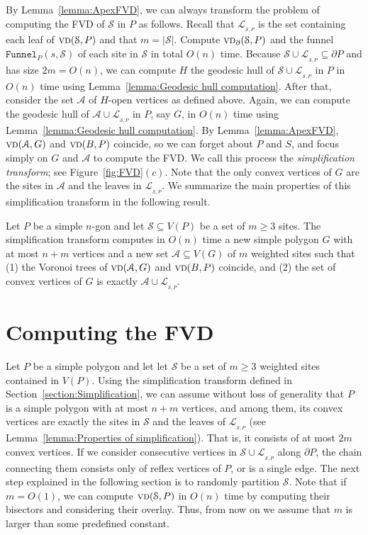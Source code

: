 \documentclass[a4paper,UKenglish]{socg-lipics-v2018}
\newcommand{\s}{\mathcal S}
\newcommand{\funnel}[2][P]{\ensuremath{\mathtt{Funnel}_{\scriptscriptstyle #1}(#2)}}
\newcommand{\vd}[2][P]{\textsc{vd}(#2, #1)}
\newcommand{\bvd}[2][P]{\textsc{vd}_{\partial}(#2, #1)}
\newcommand{\LL}[1][\s, P]{\ensuremath{\mathcal L_{_{#1}}}}
\newcommand{\A}{\ensuremath{\mathcal A}}
\begin{document}
By Lemma~\ref{lemma:ApexFVD}, we can always transform the problem of computing the FVD of $\s$ in $P$ as follows. 
Recall that $\LL$ is the set containing each leaf of $\vd{\s}$ and that $m= |\s|$.
Compute $\bvd{\s}$ and the funnel $\funnel{s, \s}$ of each site in $\s$ in total $O(n)$ time. 
Because $\s\cup \LL\subseteq \partial P$ and has size $2 m = O(n)$, we can compute $H$ the geodesic hull of $\s\cup \LL$ in $P$ in $O(n)$ time using Lemma~\ref{lemma:Geodesic hull computation}. 
After that, consider the set $\A$ of $H$-open vertices as defined above.
Again, we can compute the geodesic hull of $\A\cup \LL$ in $P$, say $G$, in $O(n)$ time using Lemma~\ref{lemma:Geodesic hull computation}. 
By Lemma~\ref{lemma:ApexFVD}, $\vd[G]{\A}$ and $\vd[P]{B}$ coincide, so we can forget about $P$ and $S$, and focus simply on $G$ and $\A$ to compute the FVD.
We call this process the \emph{simplification transform}; see Figure~\ref{fig:FVD}$(c)$. 
Note that the only convex vertices of $G$ are the sites in $\A$ and the leaves in $\LL$. 
We summarize the main properties of this simplification transform in the following result.

\begin{lemma}\label{lemma:Properties of simplification}
Let  $P$ be a simple $n$-gon and let $\s\subseteq V(P)$ be a set of $m\geq 3$ sites.
The simplification transform computes in $O(n)$ time a new simple polygon $G$ with at most $n+m$ vertices and a new set $\A\subseteq V(G)$ of $m$ weighted sites such that (1) the Voronoi trees of $\vd[G]{\A}$ and $\vd[P]{B}$ coincide, and (2) the set of convex vertices of $G$ is exactly $\A\cup \LL$.
\end{lemma}



\section{Computing the FVD}
Let  $P$ be a simple polygon and let let $\s$ be a set of $m\geq 3$ weighted sites contained in $V(P)$.
Using the simplification transform defined in Section~\ref{section:Simplification}, we can assume without loss of generality that $P$ is a simple polygon with at most $n+m$ vertices, and among them, its convex vertices are exactly the sites in $\s$ and the leaves of $\LL$ (see Lemma~\ref{lemma:Properties of simplification}). 
That is, it consists of at most $2m$ convex vertices.
If we consider consecutive vertices in $\s\cup \LL$ along $\partial P$, the chain connecting them consists only of reflex vertices of $P$, or is a single edge. 
The next step explained in the following section is to randomly partition $\s$.
Note that if $m = O(1)$, we can compute $\vd{\s}$ in $O(n)$ time by computing their bisectors and considering their overlay. Thus, from now on we assume that $m$ is larger than some predefined constant.
\end{document}
